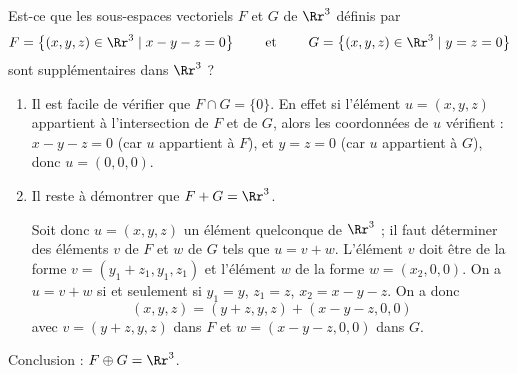 \documentclass[class=report,crop=false]{standalone}
\begin{document}
\begin{exemple}
\label{ex:evsup}
Est-ce que les sous-espaces vectoriels $F$ et $G$ de $\Rr^3$ définis par
$$F=\big\{ (x,y,z) \in \Rr^3\mid x-y-z=0\big\} \qquad \text { et } \qquad
G=\big\{(x,y,z) \in \Rr^3 \mid y=z=0\big\}$$
sont supplémentaires dans $\Rr^3$ ?



\begin{enumerate}
  \item Il est facile de vérifier que  $F\cap G=\{0\}$.
En effet si l'élément  $u=(x,y,z)$ appartient à l'intersection de $F$ et de $G$,
alors les coordonnées de $u$ vérifient :  $x-y-z=0$ (car $u$ appartient à $F$),
et  $y=z=0$ (car $u$ appartient à $G$), donc  $u=(0,0,0)$.

  \item Il reste à démontrer que $F+G=\Rr^3$.

  Soit donc  $u=(x,y,z)$ un élément quelconque de $\Rr^3$ ; il faut déterminer des éléments
$v$ de $F$ et $w$ de $G$ tels que $u=v+w$.
L'élément $v$ doit être de la forme $v=(y_1+z_1, y_1,z_1)$  et l'élément $w$ de la forme
  $w=(x_2,0,0)$.   On a $u=v+w$ si et seulement si $y_1=y$, $z_1=z$, $x_2=x-y-z$.
   On a donc
   $$(x,y,z)=(y+z,y,z)+ (x-y-z, 0,0)$$
 avec $v=(y+z,y,z)$ dans $F$  et  $w=(x-y-z, 0,0)$ dans $G$.
\end{enumerate}
Conclusion : $F \oplus G=\Rr^3$.
\end{exemple}
\end{document}
